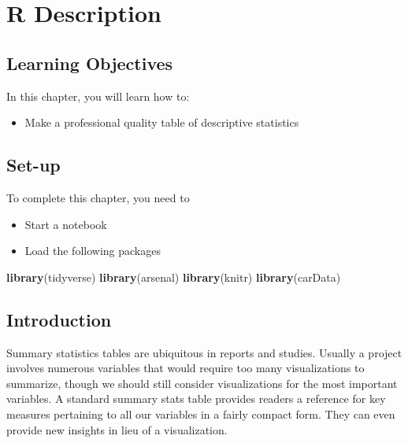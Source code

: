 \documentclass[
]{book}
\newenvironment{Shaded}{\begin{snugshade}}{\end{snugshade}}
\newcommand{\KeywordTok}[1]{\textcolor[rgb]{0.13,0.29,0.53}{\textbf{#1}}}
\newcommand{\NormalTok}[1]{#1}
\providecommand{\tightlist}{%
  \setlength{\itemsep}{0pt}\setlength{\parskip}{0pt}}
\begin{document}
\hypertarget{r-description}{%
\chapter{R Description}\label{r-description}}

\hypertarget{learning-objectives}{%
\section{Learning Objectives}\label{learning-objectives}}

In this chapter, you will learn how to:

\begin{itemize}
\tightlist
\item
  Make a professional quality table of descriptive statistics
\end{itemize}

\hypertarget{set-up}{%
\section{Set-up}\label{set-up}}

To complete this chapter, you need to

\begin{itemize}
\tightlist
\item
  Start a notebook
\item
  Load the following packages
\end{itemize}

\begin{Shaded}
\begin{Highlighting}[]
\KeywordTok{library}\NormalTok{(tidyverse)}
\KeywordTok{library}\NormalTok{(arsenal)}
\KeywordTok{library}\NormalTok{(knitr)}
\KeywordTok{library}\NormalTok{(carData)}
\end{Highlighting}
\end{Shaded}

\hypertarget{introduction}{%
\section{Introduction}\label{introduction}}

Summary statistics tables are ubiquitous in reports and studies. Usually a project involves numerous variables that would require too many visualizations to summarize, though we should still consider visualizations for the most important variables. A standard summary stats table provides readers a reference for key measures pertaining to all our variables in a fairly compact form. They can even provide new insights in lieu of a visualization.
\end{document}
